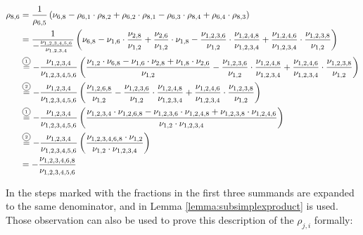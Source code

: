 \documentclass[../SymplecticSimplices.tex]{subfiles}
\begin{document}
\begin{equation*}
  \begin{split}
    \rho_{8,6} & = \frac{1}{\rho_{6, 5}} \left( \nu_{6, 8} - \rho_{6, 1} \cdot \rho_{8, 2} + \rho_{6, 2} \cdot \rho_{8, 1} - \rho_{6, 3} \cdot \rho_{8, 4} + \rho_{6, 4} \cdot \rho_{8, 3} \right) \\
    & = \frac{1}{-\frac{\nu_{1,2,3,4,5,6}}{\nu_{1,2,3,4}}} \left( \nu_{6,8} - \nu_{1,6} \cdot \frac{\nu_{2,8}}{\nu_{1,2}} + \frac{\nu_{2,6}}{\nu_{1,2}} \cdot \nu_{1,8} - \frac{\nu_{1,2,3,6}}{\nu_{1,2}} \cdot \frac{\nu_{1,2,4,8}}{\nu_{1,2,3,4}} + \frac{\nu_{1,2,4,6}}{\nu_{1,2,3,4}} \cdot \frac{\nu_{1,2,3,8}}{\nu_{1,2}} \right) \\
    & \eqcom{1} -\frac{\nu_{1,2,3,4}}{\nu_{1,2,3,4,5,6}} \left(\frac{\nu_{1,2} \cdot \nu_{6,8} - \nu_{1,6} \cdot \nu_{2,8} + \nu_{1,8} \cdot \nu_{2,6}}{\nu_{1,2}} - \frac{\nu_{1,2,3,6}}{\nu_{1,2}} \cdot \frac{\nu_{1,2,4,8}}{\nu_{1,2,3,4}} + \frac{\nu_{1,2,4,6}}{\nu_{1,2,3,4}} \cdot \frac{\nu_{1,2,3,8}}{\nu_{1,2}} \right) \\
    & \eqcom{2} -\frac{\nu_{1,2,3,4}}{\nu_{1,2,3,4,5,6}} \left(\frac{\nu_{1,2,6,8}}{\nu_{1,2}} - \frac{\nu_{1,2,3,6}}{\nu_{1,2}} \cdot \frac{\nu_{1,2,4,8}}{\nu_{1,2,3,4}} + \frac{\nu_{1,2,4,6}}{\nu_{1,2,3,4}} \cdot \frac{\nu_{1,2,3,8}}{\nu_{1,2}} \right) \\
    & \eqcom{1} -\frac{\nu_{1,2,3,4}}{\nu_{1,2,3,4,5,6}} \left(\frac{\nu_{1,2,3,4} \cdot \nu_{1,2,6,8} - \nu_{1,2,3,6} \cdot \nu_{1,2,4,8} + \nu_{1,2,3,8} \cdot \nu_{1,2,4,6}}{\nu_{1,2}\cdot\nu_{1,2,3,4}} \right) \\
    & \eqcom{2} -\frac{\nu_{1,2,3,4}}{\nu_{1,2,3,4,5,6}} \left(\frac{\nu_{1,2,3,4,6,8} \cdot \nu_{1,2}}{\nu_{1,2}\cdot\nu_{1,2,3,4}} \right) \\
    & = -\frac{\nu_{1,2,3,4,6,8}}{\nu_{1,2,3,4,5,6}} \\
  \end{split}
\end{equation*}

In the steps marked with  the fractions in the first three summands are expanded to the same denominator, and in  Lemma \ref{lemma:subsimplexproduct} is used. Those observation can also be used to prove this description of the \( \rho_{j,i} \) formally:

\pagebreak{}
\end{document}
